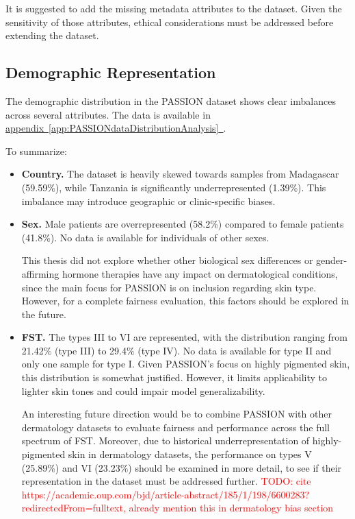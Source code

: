 \documentclass[12pt, a4paper, oneside]{book}   	%
\renewcommand{\todo}[1]{\textcolor{red}{TODO: #1}}
\newcommand{\linkapp}[1]{\hyperref[#1]{appendix~\ref{#1}~\nameref{#1}}}
\begin{document}
		It is suggested to add the missing metadata attributes to the dataset. Given the sensitivity of those attributes, ethical considerations must be addressed before extending the dataset.
		
		\subsection{Demographic Representation}	\label{chap:PASSIONDatasetAssessmentEvalDemogRepr}
		The demographic distribution in the PASSION dataset shows clear imbalances across several attributes. The data is available in \linkapp{app:PASSIONdataDistributionAnalysis}.
		
		To summarize:
		
		\begin{itemize}
			\item \textbf{Country.} The dataset is heavily skewed towards samples from Madagascar (59.59\%), while Tanzania is significantly underrepresented (1.39\%). This imbalance may introduce geographic or clinic-specific biases.
			
			\item \textbf{Sex.} Male patients are overrepresented (58.2\%) compared to female patients (41.8\%). No data is available for individuals of other sexes.
			
			This thesis did not explore whether other biological sex differences or gender-affirming hormone therapies have any impact on dermatological conditions, since the main focus for PASSION is on inclusion regarding skin type. However, for a complete fairness evaluation, this factors should be explored in the future.
			
			\item \textbf{\gls{FST}.} The types III to VI are represented, with the distribution ranging from 21.42\% (type III) to 29.4\% (type IV). No data is available for type II and only one sample for type I.  Given PASSION's focus on highly pigmented skin, this distribution is somewhat justified. However, it limits applicability to lighter skin tones and could impair model generalizability. 
			
			An interesting future direction would be to combine PASSION with other dermatology datasets to evaluate fairness and performance across the full spectrum of \gls{FST}. Moreover, due to historical underrepresentation of highly-pigmented skin in dermatology datasets, the performance on types V (25.89\%) and VI (23.23\%) should be examined in more detail, to see if their representation in the dataset must be addressed further.
			\todo{cite https://academic.oup.com/bjd/article-abstract/185/1/198/6600283?redirectedFrom=fulltext, already mention this in dermatology bias section}
			

\end{itemize}
\end{document}
